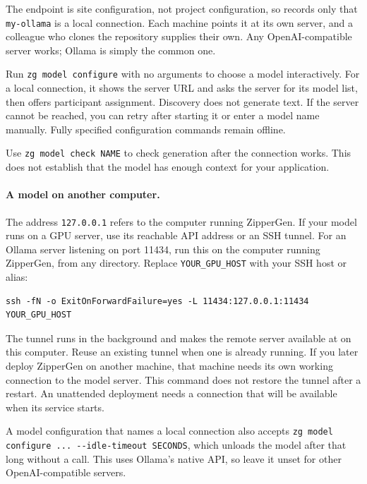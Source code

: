 \documentclass[11pt,a4paper]{article}
\begin{document}
The endpoint is site configuration, not project configuration, so
 records only that \texttt{my-ollama} is a local
connection. Each machine points it at its own server, and a colleague who
clones the repository supplies their own. Any OpenAI-compatible server works;
Ollama is simply the common one.

Run \texttt{zg model configure} with no arguments to choose a model
interactively. For a local connection, it shows the server URL and asks the
server for its model list, then offers participant assignment. Discovery does
not generate text. If the server cannot be reached, you can retry after starting
it or enter a model name manually. Fully specified configuration commands remain
offline.

Use \texttt{zg model check NAME} to check generation after the connection works.
This does not establish that the model has enough context for your application.

\paragraph{A model on another computer.}
The address \texttt{127.0.0.1} refers to the computer running ZipperGen. If your
model runs on a GPU server, use its reachable API address or an SSH tunnel.
For an Ollama server listening on port 11434, run this on the computer running
ZipperGen, from any directory. Replace \texttt{YOUR\_GPU\_HOST} with your SSH
host or alias:

\begin{lstlisting}[style=shell]
ssh -fN -o ExitOnForwardFailure=yes -L 11434:127.0.0.1:11434 YOUR_GPU_HOST
\end{lstlisting}

The tunnel runs in the background and makes the remote server available at
 on this computer. Reuse an existing tunnel
when one is already running. If you later deploy ZipperGen on another machine,
that machine needs its own working connection to the model server.
This command does not restore the tunnel after a restart. An unattended
deployment needs a connection that will be available when its service starts.

A model configuration that names a local connection also accepts
\texttt{zg model configure ... -{}-idle-timeout SECONDS}, which unloads the
model after that long without a call. This uses Ollama's native API, so leave
it unset for other OpenAI-compatible servers.
\end{document}
